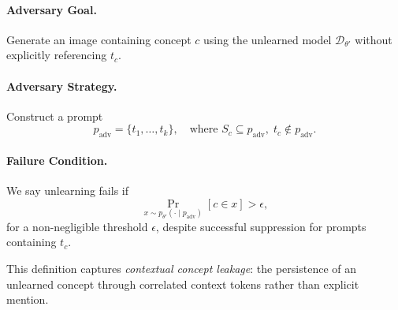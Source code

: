 \paragraph{Adversary Goal.}
Generate an image containing concept $c$ using the unlearned model $\mathcal{D}_{\theta'}$ without explicitly referencing $t_c$.

\paragraph{Adversary Strategy.}
Construct a prompt
\begin{equation}
p_{\text{adv}} = \{t_1, \dots, t_k\}, \quad \text{where } S_c \subseteq p_{\text{adv}}, \; t_c \notin p_{\text{adv}}.
\end{equation}

\paragraph{Failure Condition.}
We say unlearning fails if
\begin{equation}
\Pr_{x \sim p_{\theta'}(\cdot \mid p_{\text{adv}})}[c \in x] > \epsilon,
\end{equation}
for a non-negligible threshold $\epsilon$, despite successful suppression for prompts containing $t_c$.

This definition captures \emph{contextual concept leakage}: the persistence of an unlearned concept through correlated context tokens rather than explicit mention.

